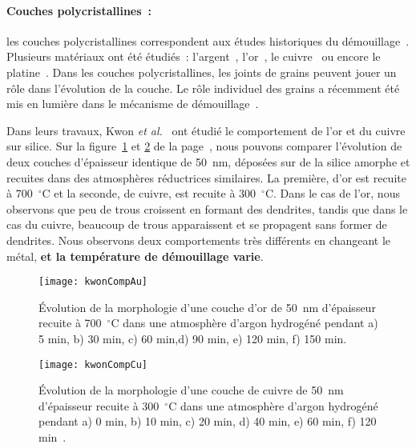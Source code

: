 \paragraph*{Couches polycristallines~:} les couches polycristallines correspondent aux études historiques du démouillage~\cite{presland1972hillock}. Plusieurs matériaux ont été étudiés~: l'argent~\cite{presland1972hillock, presland1972role, sharma1980agglomeration, sharma1980hillock, sharma1986hillock, dannenberg2000situ}, l'or~\cite{jiran1990capillary, kwon2003comparison, muller2010microstructure,jang2015crystallographic}, le cuivre~\cite{kwon2003comparison, gadkari2005comparison} ou encore le platine~\cite{gadkari2005comparison, atiya2014solid, jahangir2014situ}. Dans les couches
polycristallines, les joints de grains peuvent jouer un rôle dans l'évolution de la couche. Le rôle individuel des grains a récemment été mis en lumière dans le mécanisme de démouillage~\cite{atiya2014role, kosinova2014role}.\par 
Dans leurs travaux, Kwon\textit{ et al.}~\cite{kwon2003comparison} ont étudié le comportement de l'or et du cuivre sur silice. Sur la figure~\ref{kwonCompAu} et \ref{kwonCompCu} de la page~\pageref{kwonCompAu}, nous pouvons comparer l'évolution de deux couches d'épaisseur identique de 50~nm, déposées sur de la silice amorphe et recuites dans des atmosphères réductrices similaires. La première, d'or est recuite à 700~$^\circ$C et la seconde, de cuivre, est recuite à 300~$^\circ$C. Dans le cas de l'or, nous observons que peu de trous croissent en formant des dendrites, tandis que dans le cas du cuivre, beaucoup de trous apparaissent et se propagent sans former de dendrites. Nous observons deux comportements très différents en changeant le métal, \textbf{et la température de démouillage varie}.\par 

\begin{figure}[!p]
\centering
\texttt{[image: kwonCompAu]}
\caption{Évolution de la morphologie d'une couche d'or de 50~nm d'épaisseur recuite à 700~$^\circ$C dans une atmosphère
d'argon hydrogéné pendant a) 5 min, b) 30 min, c) 60 min,d) 90 min, e) 120 min, f) 150 min.~\cite{kwon2003comparison}}
\label{kwonCompAu}
\end{figure}


\begin{figure}[!p]
\centering
\texttt{[image: kwonCompCu]}
\caption{Évolution de la morphologie d'une couche de cuivre de 50~nm d'épaisseur recuite à 300~$^\circ$C dans une atmosphère d'argon hydrogéné pendant a) 0 min, b) 10 min, c) 20 min, d) 40 min, e) 60 min, f) 120 min~\cite{kwon2003comparison}.}
\label{kwonCompCu}
\end{figure}


